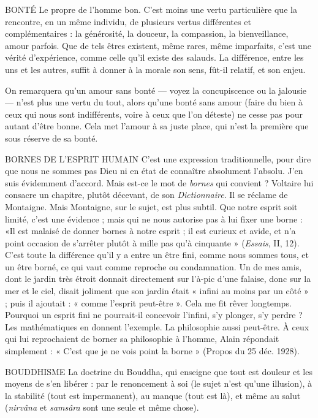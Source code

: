 BONTÉ Le propre de l’homme bon. C’est moins une vertu particulière que
la rencontre, en un même individu, de plusieurs vertus différentes
et complémentaires : la générosité, la douceur, la compassion, la bienveillance,
amour parfois. Que de tels êtres existent, même rares, même imparfaits,
c’est une vérité d'expérience, comme celle qu’il existe des salauds. La différence,
entre les uns et les autres, suffit à donner à la morale son sens, fût-il relatif, et
son enjeu.

On remarquera qu’un amour sans bonté — voyez la concupiscence ou la
jalousie — n’est plus une vertu du tout, alors qu’une bonté sans amour (faire du
bien à ceux qui nous sont indifférents, voire à ceux que l’on déteste) ne cesse
pas pour autant d’être bonne. Cela met l’amour à sa juste place, qui n’est la
première que sous réserve de sa bonté.

BORNES DE L'ESPRIT HUMAIN C'est une expression traditionnelle,
pour dire que nous ne sommes pas
Dieu ni en état de connaître absolument l'absolu. J’en suis évidemment
d’accord. Mais est-ce le mot de {\it bornes} qui convient ? Voltaire lui consacre un
chapitre, plutôt décevant, de son {\it Dictionnaire}. Il se réclame de Montaigne.
Mais Montaigne, sur le sujet, est plus subtil. Que notre esprit soit limité, c’est
une évidence ; mais qui ne nous autorise pas à lui fixer une borne : «Il est
malaisé de donner bornes à notre esprit ; il est curieux et avide, et n’a point
occasion de s’arrêter plutôt à mille pas qu’à cinquante » ({\it Essais}, II, 12). C’est
toute la différence qu’il y a entre un être fini, comme nous sommes tous, et un
être borné, ce qui vaut comme reproche ou condamnation. Un de mes amis,
dont le jardin très étroit donnait directement sur l’à-pic d’une falaise, donc sur
la mer et le ciel, disait joliment que son jardin était « infini au moins par un
côté » ; puis il ajoutait : « comme l'esprit peut-être ». Cela me fit rêver longtemps.
Pourquoi un esprit fini ne pourrait-il concevoir l'infini, s’y plonger, s’y
perdre ? Les mathématiques en donnent l’exemple. La philosophie aussi peut-être.
À ceux qui lui reprochaient de borner sa philosophie à l’homme, Alain
répondait simplement : « C’est que je ne vois point la borne » (Propos du
25 déc. 1928).

BOUDDHISME La doctrine du Bouddha, qui enseigne que tout est douleur
et les moyens de s’en libérer : par le renoncement à soi (le
sujet n’est qu’une illusion), à la stabilité (tout est impermanent), au manque
(tout est là), et même au salut ({\it nirvâna} et {\it samsâra} sont une seule et même
chose).

